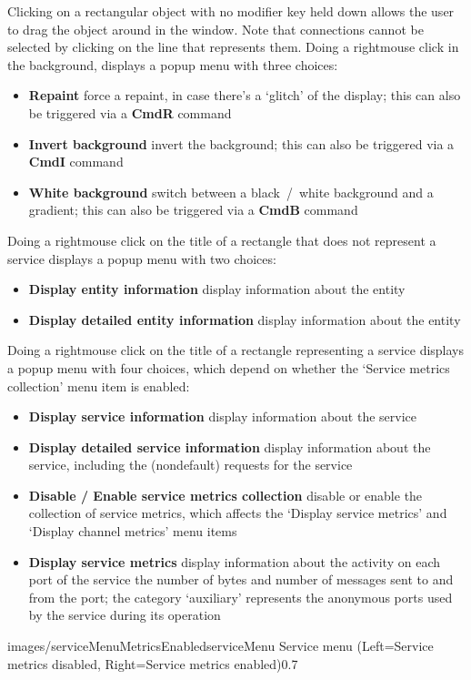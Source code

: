 Clicking on a rectangular object with no modifier key held down allows the user to drag
the object around in the window.
Note that connections cannot be selected by clicking on the line that represents them.
\clearpage
Doing a right\longDash{}mouse click in the background, displays a popup menu with three
choices:
\begin{itemize}
\item\textbf{Repaint} force a repaint, in case there's a `glitch' of the display; this
can also be triggered via a \textbf{Cmd\longDash{}R} command
\item\exSp\textbf{Invert background} invert the background; this can also be triggered via
a \textbf{Cmd\longDash{}I} command
\item\exSp\textbf{White background} switch between a black~/~white background and a
gradient; this can also be triggered via a \textbf{Cmd\longDash{}B} command
\end{itemize}
Doing a right\longDash{}mouse click on the title of a rectangle that does not represent a
service displays a popup menu with two choices:
\begin{itemize}
\item\textbf{Display entity information} display information about the entity
\item\exSp\textbf{Display detailed entity information} display information about the
entity
\end{itemize}
\clearpage
Doing a right\longDash{}mouse click on the title of a rectangle representing a service
displays a popup menu with four choices, which depend on whether the `Service metrics
collection' menu item is enabled:
\begin{itemize}
\item\textbf{Display service information} display information about the service
\item\exSp\textbf{Display detailed service information} display information about the
service, including the (non\longDash{}default) requests for the service
\item\exSp\textbf{Disable / Enable service metrics collection} disable or enable the
collection of service metrics, which affects the `Display service metrics' and `Display
channel metrics' menu items
\item\exSp\textbf{Display service metrics} display information about the activity on each
port of the service \longDash{} the number of bytes and number of messages sent to and
from the port; the category `auxiliary' represents the anonymous ports used by the service
during its operation
\end{itemize}
%
{images/serviceMenuMetricsEnabled}{serviceMenu}%
{Service menu (Left=Service metrics disabled, Right=Service metrics enabled)}{0.7}

